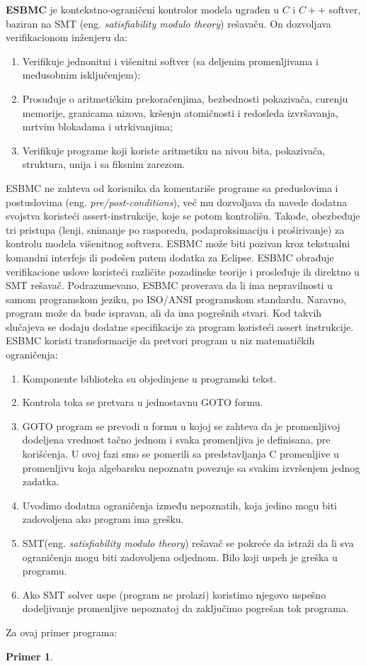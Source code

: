 \documentclass[a4paper]{article}
\newtheorem{primer}{Primer}[section]
\begin{document}
{\textbf{ESBMC} je kontekstno-ograničeni kontrolor modela ugrađen u $C$ i $C++$ softver, baziran na SMT (eng. \emph{satisfiability modulo theory}) rešavaču.  On dozvoljava verifikacionom inženjeru da: 
	\newline
	\begin{enumerate}
	\item Verifikuje jednonitni i višenitni softver (sa deljenim promenljivama i međusobnim isključenjem);
	\item Prosuđuje o aritmetičkim prekoračenjima, bezbednosti pokazivača, curenju memorije, granicama nizova, kršenju atomičnosti i redosleda izvršavanja, mrtvim blokadama i utrkivanjima; 
	\item Verifikuje programe koji koriste aritmetiku na nivou bita, pokazivača, struktura, unija i sa fiksnim zarezom.
	\end{enumerate} 
	ESBMC ne zahteva od korisnika da komentariše programe sa preduslovima i postuslovima (eng. \emph{pre/post-conditions}), već mu dozvoljava da navede dodatna svojstva koristeći assert-instrukcije, koje se potom kontrolišu. Takođe, obezbeđuje tri pristupa (lenji, snimanje po rasporedu, podaproksimaciju i proširivanje) za kontrolu modela višenitnog softvera. ESBMC može biti pozivan kroz tekstualni komandni interfejs ili podešen putem dodatka za Eclipse. ESBMC obrađuje verifikacione uslove koristeći različite pozadinske teorije i prosleđuje ih direktno u SMT rešavač. \cite{esbmc} 
	\newline
	Podrazumevano, ESBMC proverava da li ima nepravilnosti u samom programskom jeziku, po ISO/ANSI programskom standardu. Naravno, program može da bude ispravan, ali da ima pogrešnih stvari. Kod takvih slučajeva se dodaju dodatne specifikacije za program koristeći assert instrukcije. 
	\newline
	ESBMC  koristi transformacije  da pretvori program u niz matematičkih ograničenja:
	\begin{enumerate}
	\item Komponente biblioteka su objedinjene u programski tekst.
	\item Kontrola toka se pretvara u jednostavnu GOTO formu.
	\item GOTO program se prevodi u formu  u kojoj se zahteva da je promenljivoj dodeljena vrednost tačno jednom i svaka promenljiva je definisana, pre korišćenja. U ovoj fazi smo se pomerili sa predstavljanja C promenljive u promenljivu koja algebarsku nepoznatu povezuje sa svakim izvršenjem jednog zadatka.
	\item Uvodimo dodatna ograničenja između nepoznatih, koja jedino mogu biti zadovoljena ako program ima grešku.
	\item SMT(eng. \emph{satisfiability modulo theory}) rešavač se pokreće da istraži da li sva ograničenja mogu biti zadovoljena odjednom. Bilo koji uspeh je greška u programu.
	\item Ako SMT solver uspe (program ne prolazi) koristimo njegovo uspešno dodeljivanje promenljive nepoznatoj da zaključimo pogrešan tok programa.
	\end{enumerate}
	Za ovaj primer programa:
	\newline
	\begin{primer}


\end{primer}}
\end{document}
